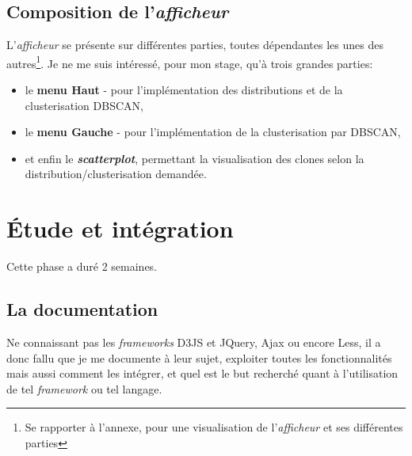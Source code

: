 \documentclass[12pt]{report}
\begin{document}
\begin{spacing}{1.2}
\subsection{Composition de l'\textit{afficheur}}

L'\textit{afficheur} se présente sur différentes parties, toutes dépendantes les unes des autres\footnote{Se rapporter à l'annexe, pour une visualisation de l'\textit{afficheur} et ses différentes parties}.
\newline Je ne me suis intéressé, pour mon stage, qu'à trois grandes parties:
\begin{itemize}
\item{le \textbf{menu Haut} - pour l'implémentation des distributions et de la clusterisation DBSCAN,}
\item{le \textbf{menu Gauche} - pour l'implémentation de la clusterisation par DBSCAN,}
\item{et enfin le \textbf{\textit{scatterplot}}, permettant la visualisation des clones selon la distribution/clusterisation demandée.}
\end{itemize}

\section{Étude et intégration}

Cette phase a duré 2 semaines.

\subsection{La documentation}
Ne connaissant pas les \textit{frameworks} D3JS et JQuery, Ajax ou encore Less, il a donc fallu que je me documente à leur sujet, exploiter toutes les fonctionnalités mais aussi comment les intégrer, et quel est le but recherché quant à l'utilisation de tel \textit{framework} ou tel langage.


\end{spacing}
\end{document}
